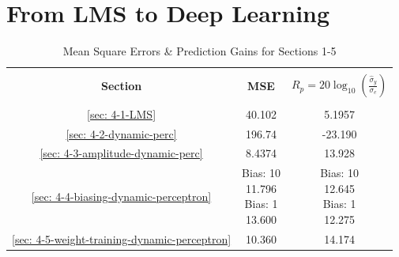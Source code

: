 \documentclass[12pt]{article}
\numberwithin{equation}{section}
\begin{document}
\pagebreak
\section{From LMS to Deep Learning} \label{sec: 4-LMS-to-DL}

		\begin{minipage}[t]{0.45\textwidth}
			\begin{table}[H]
				\centering
				\begin{tabular}{|c|c|c|}
					\hline
					&&\\[-1em]
					\textbf{Section} & \textbf{MSE} & \textbf{$R_p = 20\log_{10}({\frac{\hat{\sigma}_y}{\sigma_e}})$} \\
					&&\\[-1em]
					\hline
					\hline
					\ref{sec: 4-1-LMS}	&	40.102		&	5.1957 \\
					\hline
					\ref{sec: 4-2-dynamic-perc}	&	196.74	&	-23.190 \\
					\hline
					\ref{sec: 4-3-amplitude-dynamic-perc}	&	8.4374		&	13.928 \\
					\hline
					\ref{sec: 4-4-biasing-dynamic-perceptron} 	&	\makecell{ Bias: 10 \\ 11.796 \\ Bias: 1 \\ 13.600 \\}		&	\makecell{ Bias: 10 \\ 12.645 \\ Bias: 1 \\ 12.275 \\} \\
					\hline
					\ref{sec: 4-5-weight-training-dynamic-perceptron}	&	10.360		&	14.174 \\
					\hline
				\end{tabular}
				\captionsetup{justification=centering}
				\caption{Mean Square Errors \& Prediction Gains for Sections 1-5}
				\label{tab: 4-mse-Rp}
			\end{table}
		\end{minipage}%
		\begin{minipage}{0.08\textwidth}
			\hspace*{0.08\textwidth}
		\end{minipage}%
\end{document}
